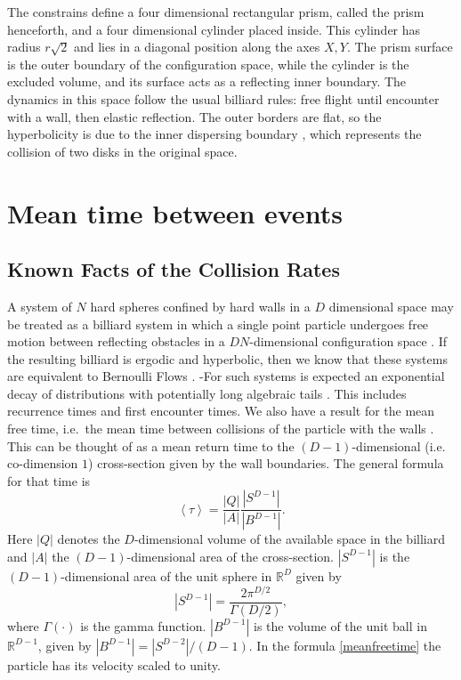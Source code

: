 \documentclass[letterpaper,10pt, jcp, aps]{revtex4-1}
\newcommand{\mean}[1]{\left \langle #1 \right \rangle}
\newcommand{\RR}{\mathbb{R}}
\begin{document}
The constrains define a four dimensional
rectangular prism, called the prism henceforth,   
and a four dimensional cylinder placed inside.
This cylinder has radius $r\sqrt{2}$ and lies
in  a diagonal position along the axes $X, Y$.
The prism surface is the outer boundary of the configuration space,
while the cylinder is the excluded volume, and its surface
acts as a reflecting inner boundary.
The dynamics in this space follow
the usual billiard rules: free flight until
encounter with a wall, then elastic reflection.
The outer borders are flat, so the
hyperbolicity is due to the inner dispersing
boundary \cite{Sim99}, which represents the collision of
two disks in the original space.


\section{Mean time between events}


\subsection{Known Facts of the Collision Rates}

A system of $N$ hard spheres confined by hard walls in a $D$ dimensional
space may be treated as a billiard system 
in which a single point  particle undergoes free motion between reflecting obstacles 
in a $ D N $-dimensional configuration space \cite{Sinai70, Sim99, MarkChern}. 
If the resulting billiard is ergodic and hyperbolic, then we know that
these systems are equivalent to Bernoulli Flows \cite{Gallavotti74}.
-For such systems is expected an exponential decay of 
distributions \cite{AbadiGalves} with potentially
long algebraic tails \cite{ZasTip}. 
This includes recurrence times and
first encounter times. We also
have a result for the mean free time, i.e.\ the mean time between 
collisions of the particle with the walls \cite{MarkChern}. 
This can be thought of as a mean return time to the $(D-1)$-dimensional 
(i.e. co-dimension $1$) cross-section given by the wall boundaries.
The general formula for that time is
\begin{equation}\label{meanfreetime}
 \mean{\tau} = \frac{|Q|}{|A|} \frac{|S^{D-1}|}{|B^{D-1}|}.
\end{equation}
Here $|Q|$ denotes the $D$-dimensional volume of the available 
space in the billiard and 
$|A|$ the $(D-1)$-dimensional area of the cross-section.
 $|S^{D-1}|$ is the $(D-1)$-dimensional area of the unit sphere in $\RR^D$ given by
\begin{equation}
  |S^{D-1}| = \frac{2 \pi^{D/2}}{\Gamma(D/2)},
\end{equation}
where $\Gamma(\cdot)$ is the gamma function. 
$|B^{D-1}|$ is the volume of the unit ball 
in $\RR^{D-1}$, given by $|B^{D-1}| = |S^{D-2}| / (D-1)$.
In the formula \ref{meanfreetime}  the particle has 
its velocity scaled to unity.
\end{document}
